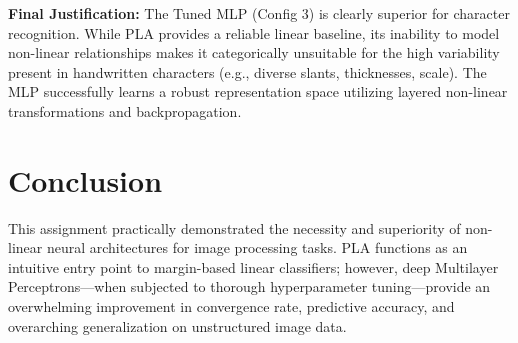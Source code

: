 \documentclass[12pt]{article}
\begin{document}
\textbf{Final Justification:} The Tuned MLP (Config 3) is clearly superior for character recognition. While PLA provides a reliable linear baseline, its inability to model non-linear relationships makes it categorically unsuitable for the high variability present in handwritten characters (e.g., diverse slants, thicknesses, scale). The MLP successfully learns a robust representation space utilizing layered non-linear transformations and backpropagation.


\section{Conclusion}

This assignment practically demonstrated the necessity and superiority of non-linear neural architectures for image processing tasks. PLA functions as an intuitive entry point to margin-based linear classifiers; however, deep Multilayer Perceptrons—when subjected to thorough hyperparameter tuning—provide an overwhelming improvement in convergence rate, predictive accuracy, and overarching generalization on unstructured image data.
\end{document}

